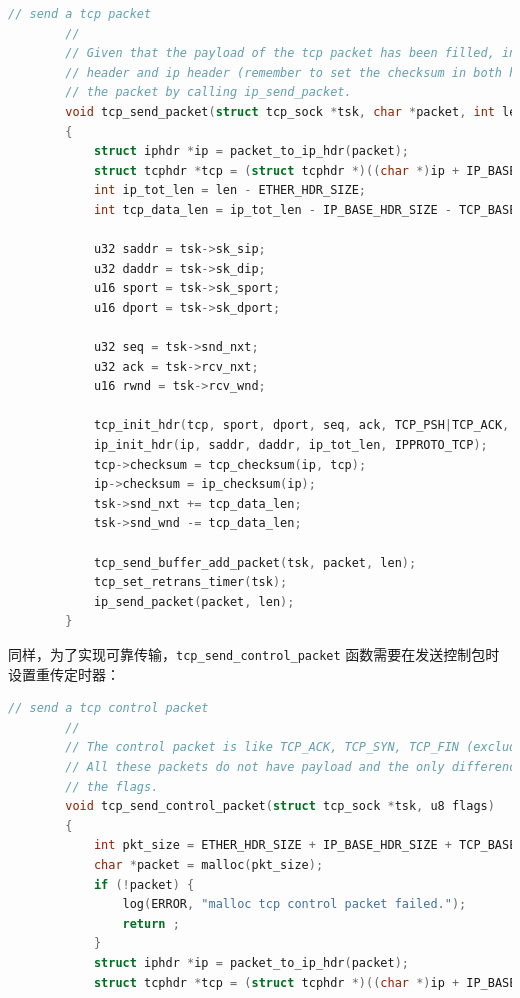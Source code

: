 \documentclass[UTF8]{report}
\begin{document}
\begin{enumerate}
    \begin{lstlisting}[language=C]
        // send a tcp packet
        //
        // Given that the payload of the tcp packet has been filled, initialize the tcp 
        // header and ip header (remember to set the checksum in both header), and emit 
        // the packet by calling ip_send_packet.
        void tcp_send_packet(struct tcp_sock *tsk, char *packet, int len) 
        {
            struct iphdr *ip = packet_to_ip_hdr(packet);
            struct tcphdr *tcp = (struct tcphdr *)((char *)ip + IP_BASE_HDR_SIZE);
            int ip_tot_len = len - ETHER_HDR_SIZE;
            int tcp_data_len = ip_tot_len - IP_BASE_HDR_SIZE - TCP_BASE_HDR_SIZE;
        
            u32 saddr = tsk->sk_sip;
            u32	daddr = tsk->sk_dip;
            u16 sport = tsk->sk_sport;
            u16 dport = tsk->sk_dport;
        
            u32 seq = tsk->snd_nxt;
            u32 ack = tsk->rcv_nxt;
            u16 rwnd = tsk->rcv_wnd;
        
            tcp_init_hdr(tcp, sport, dport, seq, ack, TCP_PSH|TCP_ACK, rwnd);
            ip_init_hdr(ip, saddr, daddr, ip_tot_len, IPPROTO_TCP); 
            tcp->checksum = tcp_checksum(ip, tcp);
            ip->checksum = ip_checksum(ip);
            tsk->snd_nxt += tcp_data_len;
            tsk->snd_wnd -= tcp_data_len;
        
            tcp_send_buffer_add_packet(tsk, packet, len);
            tcp_set_retrans_timer(tsk);
            ip_send_packet(packet, len);
        }
    \end{lstlisting}
    
    同样，为了实现可靠传输，\texttt{tcp_send_control_packet} 函数需要在发送控制包时设置重传定时器：

    \begin{lstlisting}[language=C]
        // send a tcp control packet
        //
        // The control packet is like TCP_ACK, TCP_SYN, TCP_FIN (excluding TCP_RST).
        // All these packets do not have payload and the only difference among these is 
        // the flags.
        void tcp_send_control_packet(struct tcp_sock *tsk, u8 flags)
        {
            int pkt_size = ETHER_HDR_SIZE + IP_BASE_HDR_SIZE + TCP_BASE_HDR_SIZE;
            char *packet = malloc(pkt_size);
            if (!packet) {
                log(ERROR, "malloc tcp control packet failed.");
                return ;
            }
            struct iphdr *ip = packet_to_ip_hdr(packet);
            struct tcphdr *tcp = (struct tcphdr *)((char *)ip + IP_BASE_HDR_SIZE);
        

\end{lstlisting}
\end{enumerate}
\end{document}
